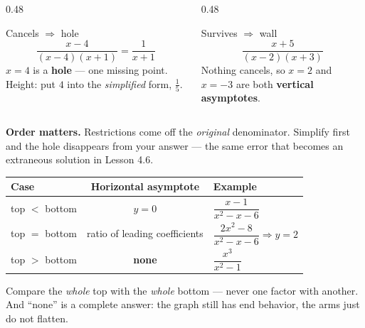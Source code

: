 \documentclass[aspectratio=169, 11pt]{beamer}
\begin{document}
\begin{frame}[t, plain]
  \begin{columns}[T]
    \begin{column}{0.48\textwidth}
      \begin{block}{Cancels $\Rightarrow$ hole}
        \[ \frac{x-4}{(x-4)(x+1)}=\frac{1}{x+1} \]
        $x=4$ is a \textbf{hole} --- one missing point. Height: put $4$ into the \emph{simplified}
        form, $\frac15$.
      \end{block}
    \end{column}
    \begin{column}{0.48\textwidth}
      \begin{block}{Survives $\Rightarrow$ wall}
        \[ \frac{x+5}{(x-2)(x+3)} \]
        Nothing cancels, so $x=2$ and $x=-3$ are both \textbf{vertical asymptotes}.
      \end{block}
    \end{column}
  \end{columns}
  \vspace{8pt}
  {\footnotesize \textbf{Order matters.} Restrictions come off the \emph{original} denominator.
  Simplify first and the hole disappears from your answer --- the same error that becomes an extraneous
  solution in Lesson 4.6.}
\end{frame}

\begin{frame}[t, plain]
  \centering
  \renewcommand{\arraystretch}{1.5}
  \begin{tabular}{|l|c|l|}
  \hline
  \textbf{Case} & \textbf{Horizontal asymptote} & \textbf{Example} \\ \hline
  top $<$ bottom & $y=0$ & $\dfrac{x-1}{x^2-x-6}$ \\ \hline
  top $=$ bottom & ratio of leading coefficients & $\dfrac{2x^2-8}{x^2-x-6} \Rightarrow y=2$ \\ \hline
  top $>$ bottom & \textbf{none} & $\dfrac{x^3}{x^2-1}$ \\ \hline
  \end{tabular}

  \vspace{8pt}
  \begin{block}{}
    Compare the \emph{whole} top with the \emph{whole} bottom --- never one factor with another.
    And ``none'' is a complete answer: the graph still has end behavior, the arms just do not flatten.
  \end{block}
\end{frame}
\end{document}
